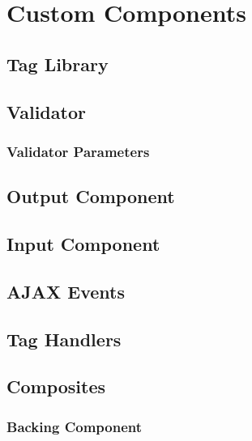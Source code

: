 %

\chapter{Custom Components}

\section{Tag Library}

\section{Validator}

\subsection{Validator Parameters}

\section{Output Component}

\section{Input Component}

\section{AJAX Events}

\section{Tag Handlers}

\section{Composites}

\subsection{Backing Component}